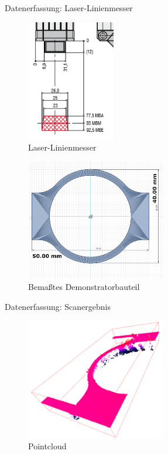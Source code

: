 \documentclass[../slides.tex]{subfiles}
\begin{document}
\begin{frame}{Datenerfassung: Laser-Linienmesser}
    \begin{minipage}[t]{.3\textwidth}
        \begin{figure}[]
            \centering
            \includegraphics[height=150pt]{img_niklas/Scanner.PNG}
            \caption{Laser-Linienmesser}
            \label{fig:linescanner}
        \end{figure}
        \end{minipage}
        \hfill
        \begin{minipage}[t]{.65\textwidth}
        \begin{figure}[]
            \centering
            \includegraphics[height=150pt]{img_niklas/demo_size.png}
            \caption{Bemaßtes Demonstratorbauteil}
            \label{fig:versuchsaufbau}
        \end{figure}
        \end{minipage}
\end{frame}

\begin{frame}{Datenerfassung: Scanergebnis}
    \begin{figure}
        \centering
        \includegraphics[height=150pt]{img_niklas/pc_with_outliers.PNG}
        \caption{Pointcloud}
        \label{fig:pcoultiers}
    \end{figure}
\end{frame}
\end{document}
